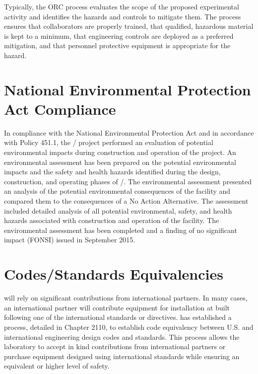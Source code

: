 Typically, the ORC process evaluates the scope of the proposed
experimental activity and identifies the hazards and controls to
mitigate them. The process ensures that collaborators are properly
trained, that qualified, hazardous material is kept to a minimum, that
engineering controls are deployed as a preferred mitigation, and that
personnel protective equipment is appropriate for the hazard.

\section{National Environmental Protection Act Compliance}

In compliance with the National Environmental Protection Act and in
accordance with  Policy 451.1, the
/ project performed an evaluation of potential
environmental impacts during construction and operation of the
project.  An environmental assessment has been prepared on the
potential environmental impacts and the safety and health hazards
identified during the design, construction, and operating phases of
/.  The environmental assessment presented an
analysis of the potential environmental consequences of the facility
and compared them to the consequences of a No Action Alternative. The
assessment included detailed analysis of all potential environmental,
safety, and health hazards associated with construction and operation
of the facility.  The environmental assessment has been completed and
a finding of no significant impact (FONSI) issued in September 2015.

\section{Codes/Standards Equivalencies}
\label{sec:esh_codes}

 will rely on significant contributions from international
partners. In many cases, an international partner will contribute
equipment for installation at \fnal built following one of the
international standards or directives. \fnal has established a
process, detailed in  Chapter 2110, to establish code
equivalency between U.S. and international engineering design codes
and standards. This process allows the laboratory to accept in kind
contributions from international partners or purchase equipment
designed using international standards while ensuring an equivalent or
higher level of safety.

